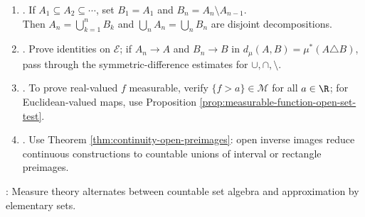 \begin{method} \label{meth:measure-measurability-proof-patterns-source-todo} 
\begin{enumerate}[label=(\roman*)]
\setlength{\itemsep}{0pt}
\item {}. If $A_1\subseteq A_2\subseteq\cdots$, set $B_1=A_1$ and $B_n=A_n\setminus A_{n-1}$.\\
Then $A_n=\bigcup\limits_{k=1}^nB_k$ and $\bigcup\limits_nA_n=\bigcup\limits_nB_n$ are disjoint decompositions.
\item {}. Prove identities on $\mathcal{E}$; if $A_n\to A$ and $B_n\to B$ in $d_\mu(A,B)=\mu^\ast(A\triangle B)$, pass through the symmetric-difference estimates for $\cup,\cap,\setminus$.
\item {}. To prove real-valued $f$ measurable, verify $\{f>a\}\in\mathcal{M}$ for all $a\in\R$; for Euclidean-valued maps, use Proposition \ref{prop:measurable-function-open-set-test}.
\item {}. Use Theorem \ref{thm:continuity-open-preimages}: open inverse images reduce continuous constructions to countable unions of interval or rectangle preimages.
\end{enumerate}
: Measure theory alternates between countable set algebra and approximation by elementary sets.
\end{method}
